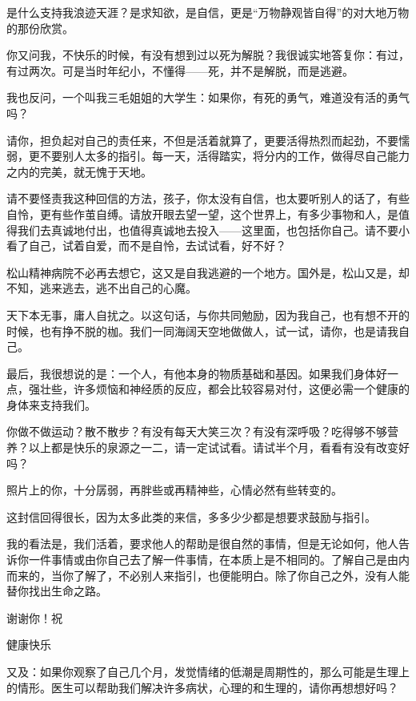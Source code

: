 \par 是什么支持我浪迹天涯？是求知欲，是自信，更是“万物静观皆自得”的对大地万物的那份欣赏。
\par 你又问我，不快乐的时候，有没有想到过以死为解脱？我很诚实地答复你：有过，有过两次。可是当时年纪小，不懂得——死，并不是解脱，而是逃避。
\par 我也反问，一个叫我三毛姐姐的大学生：如果你，有死的勇气，难道没有活的勇气吗？
\par 请你，担负起对自己的责任来，不但是活着就算了，更要活得热烈而起劲，不要懦弱，更不要别人太多的指引。每一天，活得踏实，将分内的工作，做得尽自己能力之内的完美，就无愧于天地。
\par 请不要怪责我这种回信的方法，孩子，你太没有自信，也太要听别人的话了，有些自怜，更有些作茧自缚。请放开眼去望一望，这个世界上，有多少事物和人，是值得我们去真诚地付出，也值得真诚地去投入——这里面，也包括你自己。请不要小看了自己，试着自爱，而不是自怜，去试试看，好不好？
\par 松山精神病院不必再去想它，这又是自我逃避的一个地方。国外是，松山又是，却不知，逃来逃去，逃不出自己的心魔。
\par 天下本无事，庸人自扰之。以这句话，与你共同勉励，因为我自己，也有想不开的时候，也有挣不脱的枷。我们一同海阔天空地做做人，试一试，请你，也是请我自己。
\par 最后，我很想说的是：一个人，有他本身的物质基础和基因。如果我们身体好一点，强壮些，许多烦恼和神经质的反应，都会比较容易对付，这便必需一个健康的身体来支持我们。
\par 你做不做运动？散不散步？有没有每天大笑三次？有没有深呼吸？吃得够不够营养？以上都是快乐的泉源之一二，请一定试试看。请试半个月，看看有没有改变好吗？
\par 照片上的你，十分孱弱，再胖些或再精神些，心情必然有些转变的。
\par 这封信回得很长，因为太多此类的来信，多多少少都是想要求鼓励与指引。
\par 我的看法是，我们活着，要求他人的帮助是很自然的事情，但是无论如何，他人告诉你一件事情或由你自己去了解一件事情，在本质上是不相同的。了解自己是由内而来的，当你了解了，不必别人来指引，也便能明白。除了你自己之外，没有人能替你找出生命之路。
\par 谢谢你！祝
\par 健康快乐
\par {}
\par 又及：如果你观察了自己几个月，发觉情绪的低潮是周期性的，那么可能是生理上的情形。医生可以帮助我们解决许多病状，心理的和生理的，请你再想想好吗？

\subsubsection{}




